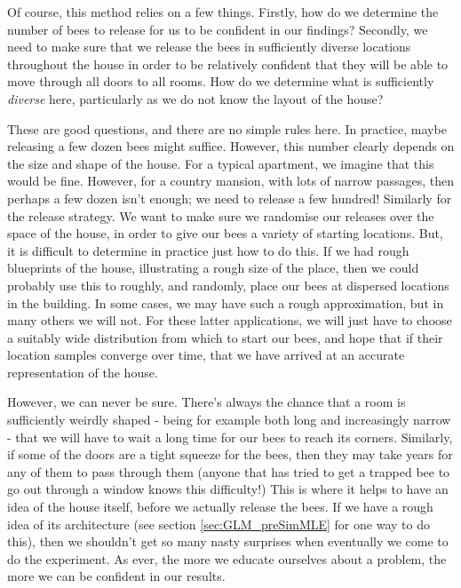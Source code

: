 \documentclass[11pt,fullpage]{book}
\begin{document}
Of course, this method relies on a few things. Firstly, how do we determine the number of bees to release for us to be confident in our findings? Secondly, we need to make sure that we release the bees in sufficiently diverse locations throughout the house in order to be relatively confident that they will be able to move through all doors to all rooms. How do we determine what is sufficiently \textit{diverse} here, particularly as we do not know the layout of the house?

These are good questions, and there are no simple rules here. In practice, maybe releasing a few dozen bees might suffice. However, this number clearly depends on the size and shape of the house. For a typical apartment, we imagine that this would be fine. However, for a country mansion, with lots of narrow passages, then perhaps a few dozen isn't enough; we need to release a few hundred! Similarly for the release strategy. We want to make sure we randomise our releases over the space of the house, in order to give our bees a variety of starting locations. But, it is difficult to determine in practice just how to do this. If we had rough blueprints of the house, illustrating a rough size of the place, then we could probably use this to roughly, and randomly, place our bees at dispersed locations in the building. In some cases, we may have such a rough approximation, but in many others we will not. For these latter applications, we will just have to choose a suitably wide distribution from which to start our bees, and hope that if their location samples converge over time, that we have arrived at an accurate representation of the house.

However, we can never be sure. There's always the chance that a room is sufficiently weirdly shaped - being for example both long and increasingly narrow - that we will have to wait a long time for our bees to reach its corners. Similarly, if some of the doors are a tight squeeze for the bees, then they may take years for any of them to pass through them (anyone that has tried to get a trapped bee to go out through a window knows this difficulty!) This is where it helps to have an idea of the house itself, before we actually release the bees. If we have a rough idea of its architecture (see section \ref{sec:GLM_preSimMLE} for one way to do this), then we shouldn't get so many nasty surprises when eventually we come to do the experiment. As ever, the more we educate ourselves about a problem, the more we can be confident in our results.
\end{document}
